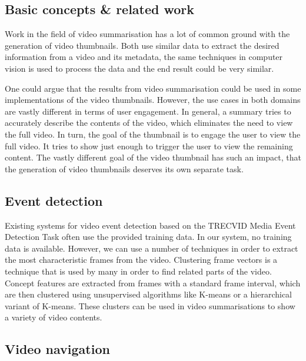 \documentclass{../resources/sig-alternate-05-2015}
\begin{document}
\subsection{Basic concepts \& related work}
\label{related work}

Work in the field of video summarisation has a lot of common ground with the generation of video thumbnails. Both use similar data to extract the desired information from a video and its metadata, the same techniques in computer vision is used to process the data and the end result could be very similar. 

One could argue that the results from video summarisation could be used in some implementations of the video thumbnails. However, the use cases in both domains are vastly different in terms of user engagement. In general, a summary tries to accurately describe the contents of the video, which eliminates the need to view the full video. In turn, the goal of the thumbnail is to engage the user to view the full video. It tries to show just enough to trigger the user to view the remaining content. The vastly different goal of the video thumbnail has such an impact, that the generation of video thumbnails deserves its own separate task.

\subsection{Event detection}

Existing systems for video event detection based on the TRECVID Media Event Detection Task often use the provided training data. In our system, no training data is available. However, we can use a number of techniques in order to extract the most characteristic frames from the video. Clustering frame vectors is a technique that is used by many in order to find related parts of the video. Concept features are extracted from frames with a standard frame interval, which are then clustered using unsupervised algorithms like K-means or a hierarchical variant of K-means. These clusters can be used in video summarisations to show a variety of video contents. 

\subsection{Video navigation}
\label{video navigation}
\end{document}
